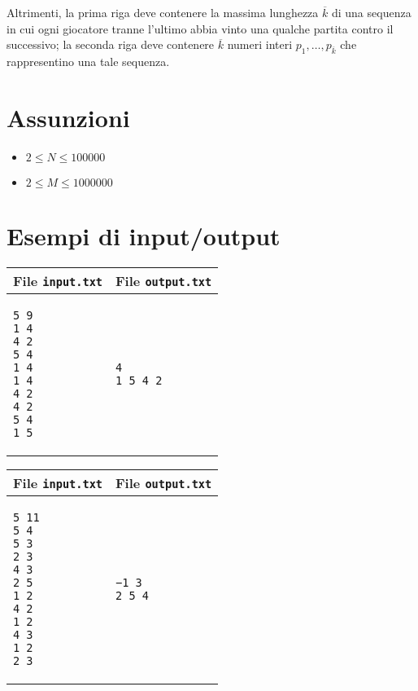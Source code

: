 \documentclass[a4paper,11pt]{article}
\begin{document}
      Altrimenti, la prima riga deve contenere
      la massima lunghezza $\overline{k}$ di una sequenza in cui ogni giocatore tranne l'ultimo abbia vinto una qualche partita contro il successivo;
      la seconda riga deve contenere $\overline{k}$ numeri interi $p_{1}, \ldots, p_{\overline{k}}$
      che rappresentino una tale sequenza.
    
  \section*{Assunzioni}
  \begin{itemize}
  
    \item $2 ≤ N ≤  100000$
    \item $2 ≤ M ≤ 1000000$
  \end{itemize}

\section*{Esempi di input/output}

  
    \noindent
    \begin{tabular}{p{11cm}|p{5cm}}
    \toprule
    \textbf{File \texttt{input.txt}}
    & \textbf{File \texttt{output.txt}}
    \\
    \midrule
    \scriptsize
    \begin{verbatim}
5 9
1 4
4 2
5 4
1 4
1 4
4 2
4 2
5 4
1 5
      \end{verbatim}
    &
    \scriptsize
    \begin{verbatim}
4
1 5 4 2
      \end{verbatim}
    \\
    \bottomrule
    \end{tabular}
  
    \noindent
    \begin{tabular}{p{11cm}|p{5cm}}
    \toprule
    \textbf{File \texttt{input.txt}}
    & \textbf{File \texttt{output.txt}}
    \\
    \midrule
    \scriptsize
    \begin{verbatim}
5 11
5 4
5 3
2 3
4 3
2 5
1 2
4 2
1 2
4 3
1 2
2 3
      \end{verbatim}
    &
    \scriptsize
    \begin{verbatim}
−1 3
2 5 4
      \end{verbatim}
    \\
    \bottomrule
    \end{tabular}
  
\end{document}
